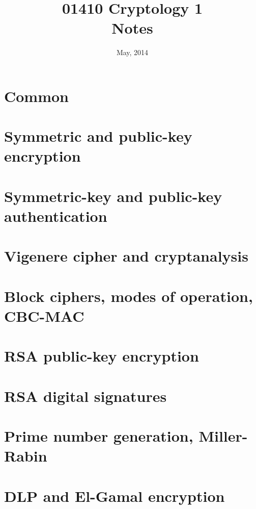 \documentclass{article}
\title{
  01410 Cryptology 1\\
  Notes
}
\date{May, 2014}
\author{}
\begin{document}
\maketitle
\clearpage

\tableofcontents
\clearpage

\section{Common}

\clearpage

\section{Symmetric and public-key encryption}

\clearpage

\section{Symmetric-key and public-key authentication}

\clearpage

\section{Vigenere cipher and cryptanalysis}

\clearpage

\section{Block ciphers, modes of operation, CBC-MAC}

\clearpage

\section{RSA public-key encryption}

\clearpage

\section{RSA digital signatures}

\clearpage

\section{Prime number generation, Miller-Rabin}

\clearpage

\section{DLP and El-Gamal encryption}

\clearpage
\end{document}
